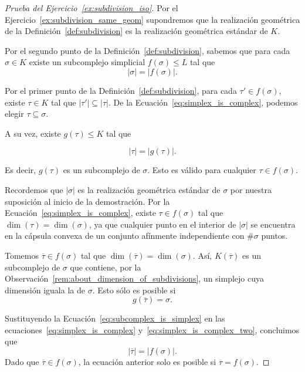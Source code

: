 \documentclass{standalone}
\begin{document}
	\begin{proof}[Prueba del Ejercicio~\ref{ex:subdivision_iso}]
		Por el Ejercicio~\ref{ex:subdivision_same_geom} supondremos que la realización geométrica de la Definición~\ref{def:subdivision} es la realización geométrica estándar de $K$.
		
		Por el segundo punto de la Definición~\ref{def:subdivision}, sabemos que para cada $\sigma\in K$ existe un subcomplejo simplicial $f(\sigma)\leq L$ tal que
		\begin{equation}\label{eq:simplex_is_complex}
			|\sigma|=|f(\sigma)|.
		\end{equation}
		
		Por el primer punto de la Definición~\ref{def:subdivision}, para cada $\tau'\in f(\sigma)$, existe $\tau\in K$ tal que $|\tau'|\subseteq|\tau|$. De la Ecuación~\ref{eq:simplex_is_complex}, podemos elegir $\tau\subseteq\sigma$.
		
		A su vez, existe $g(\tau)\leq K$ tal que
		
		\begin{equation}\label{eq:simplex_is_complex_two}
			|\tau|=|g(\tau)|.
		\end{equation}
		
		Es decir, $g(\tau)$ es un subcomplejo de $\sigma$. Esto es válido para cualquier $\tau\in f(\sigma)$.
		
		\begin{remark}\label{rem:about_dimension_of_subdivisions}
			Recordemos que $|\sigma|$ es la realización geométrica estándar de $\sigma$ por nuestra suposición al inicio de la demostración. Por la Ecuación~\ref{eq:simplex_is_complex}, existe $\tau\in f(\sigma)$ tal que $\dim(\tau) = \dim(\sigma)$, ya que cualquier punto en el interior de $|\sigma|$ se encuentra en la cápsula convexa de un conjunto afínmente independiente con $\#\sigma$ puntos.
		\end{remark} 
		
		Tomemos $\overline{\tau}\in f(\sigma)$ tal que $\dim(\overline{\tau}) = \dim(\sigma)$. Así, $K(\overline{\tau})$ es un subcomplejo de $\sigma$ que contiene, por la Observación~\ref{rem:about_dimension_of_subdivisions}, un simplejo cuya dimensión iguala la de $\sigma$. Esto sólo es posible si 
		\begin{equation}\label{eq:subcomplex_is_simplex}
			g(\overline{\tau})=\sigma.
		\end{equation}
		
		Sustituyendo la Ecuación~\ref{eq:subcomplex_is_simplex} en las ecuaciones~\ref{eq:simplex_is_complex} y~\ref{eq:simplex_is_complex_two}, concluimos que 
		\[
		|\overline{\tau}|=|f(\sigma)|.
		\] 
		Dado que $\overline{\tau}\in f(\sigma)$, la ecuación anterior solo es posible si $\overline{\tau}=f(\sigma)$.
		

\end{proof}
\end{document}
